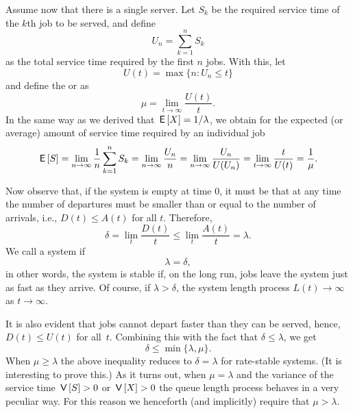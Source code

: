 Assume now that there is a single server. Let $S_k$ be the required
service time of the $k$th job to be served, and define
\begin{equation*}
U_n = \sum_{k=1}^n S_k
\end{equation*}
as the total service time required by the first $n$ jobs. With this,
let 
\begin{equation*}
  U(t) = \max\{n: U_n \leq t\}
\end{equation*}
and  define the  or  as
\begin{equation*}
  \mu = \lim_{t\to\infty} \frac{U(t)}t.
\end{equation*}
In the same way as we derived that $\,\mathsf{E}\left[X\right]= 1/\lambda$, we obtain for
the expected (or average) amount of service time required by an individual
job
\begin{equation*}
  \,\mathsf{E}\left[S\right] = \lim_{n\to\infty} \frac 1 n \sum_{k=1}^n S_k = \lim_{n\to\infty} \frac{U_n}{n} = \lim_{n\to\infty} \frac{U_n}{U(U_n)} = \lim_{t\to\infty} \frac t{U(t)} = \frac 1 \mu.
\end{equation*}

Now observe that, if the system is empty at time $0$, it must be that
at any time the number of departures must be smaller than or equal to the number
of arrivals, i.e., $D(t) \leq A(t)$ for all $t$. Therefore,
\begin{equation}\label{eq:26}
\delta =   \lim_t \frac{D(t)}t \leq \lim_t \frac{A(t)}t = \lambda.
\end{equation}
We call a system  if
\begin{equation*}
  \lambda = \delta,
\end{equation*}
in other words, the system is stable if, on the long run, jobs leave
the system just as fast as they arrive. Of course, if
$\lambda > \delta$, the system length process $L(t) \to \infty$ as
$t\to \infty$.

It is also evident that jobs cannot depart faster than they can be
served, hence, $D(t) \leq U(t)$ for all~$t$. Combining this with the
fact that $\delta \leq \lambda$, we get
\begin{equation*}
  \delta \leq \min\{\lambda, \mu\}.
\end{equation*}
When $\mu \geq \lambda$ the above inequality reduces to $\delta = \lambda$ for rate-stable systems.
(It is interesting to prove this.)
As it turns out, when $\mu = \lambda$ and the variance of the service time $\,\mathsf{V}\left[S\right] > 0$ or $\,\mathsf{V}\left[X\right] >0$ the queue length process behaves in a very peculiar way.
For this reason we henceforth (and implicitly) require that $\mu > \lambda$.



